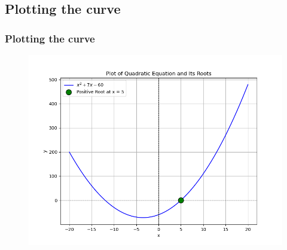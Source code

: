 \documentclass{beamer}
\theoremstyle{remark}
\numberwithin{equation}{section}
\begin{document}
	\subsection{Plotting the curve}
	\begin{frame}
		\frametitle{Plotting the curve}
		\begin{figure}[h]
			\includegraphics[scale=0.5]{fig.png}
			\centering
		\end{figure}
	\end{frame}
	
\end{document}
